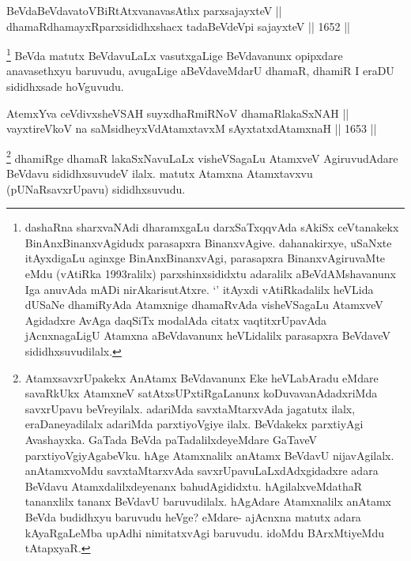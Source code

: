 \begin{shl}
BeVdaBeVdavatoVBiRtAtxvanavasAthx parxsajayxteV ||  \\
dhamaRdhamayxRparxsididhxshacx tadaBeVdeV\s pi sajayxteV \hfill || 1652 || 
\end{shl}

\begin{artha}
\footnote{dashaRna sharxvaNAdi dharamxgaLu darxSaTxqqvAda sAkiSx ceVtanakekx BinAnxBinanxvAgidudx parasapxra BinanxvAgive. dahanakirxye, uSaNxte itAyxdigaLu aginxge BinAnxBinanxvAgi, parasapxra BinanxvAgiruvaMte eMdu (vAtiRka 1993ralilx) parxshinxsididxtu adaralilx aBeVdAMshavanunx Iga anuvAda mADi nirAkarisutAtxre. `\stext' itAyxdi vAtiRkadalilx heVLida dUSaNe dhamiRyAda Atamxnige dhamaRvAda visheVSagaLu AtamxveV Agidadxre AvAga daqSiTx modalAda citatx vaqtitxrUpavAda jAcnxnagaLigU Atamxna aBeVdavanunx heVLidalilx parasapxra BeVdaveV sididhxsuvudilalx.}
BeVda matutx BeVdavuLaLx vasutxgaLige BeVdavanunx opipxdare anavasethxyu baruvudu, avugaLige aBeVdaveMdarU dhamaR, dhamiR I eraDU sididhxsade hoVguvudu.
\end{artha}

\begin{shl}
AtemxYva ceVdivxsheVSAH suyxdhaRmiRNoV dhamaRlakaSxNAH ||  \\
vayxtireVkoV na saMsidheyxVdAtamxtavxM sAyxtatxdA\s \s tamxnaH \hfill || 1653 ||  
\end{shl}

\begin{artha}
\footnote{AtamxsavxrUpakekx AnAtamx BeVdavanunx Eke heVLabAradu eMdare savaRkUkx AtamxneV satAtxsUPxtiRgaLanunx koDuvavanAdadxriMda savxrUpavu beVreyilalx. adariMda savxtaMtarxvAda jagatutx ilalx, eraDaneyadilalx adariMda parxtiyoVgiye ilalx. BeVdakekx parxtiyAgi Avashayxka. GaTada BeVda paTadalilxdeyeMdare GaTaveV parxtiyoVgiyAgabeVku. hAge Atamxnalilx anAtamx BeVdavU nijavAgilalx. anAtamxvoMdu savxtaMtarxvAda savxrUpavuLaLxdAdxgidadxre adara BeVdavu Atamxdalilxdeyenanx bahudAgididxtu. hAgilalxveMdathaR tananxlilx tananx BeVdavU baruvudilalx. hAgAdare Atamxnalilx anAtamx BeVda budidhxyu baruvudu heVge? eMdare- ajAcnxna matutx adara kAyaRgaLeMba upAdhi nimitatxvAgi baruvudu. idoMdu BArxMtiyeMdu tAtapxyaR.}
dhamiRge dhamaR lakaSxNavuLaLx visheVSagaLu AtamxveV AgiruvudAdare BeVdavu sididhxsuvudeV ilalx. matutx Atamxna Atamxtavxvu (pUNaRsavxrUpavu) sididhxsuvudu.
\end{artha}


